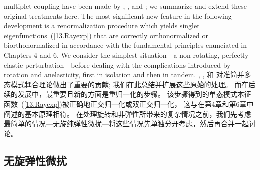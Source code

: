 {{multiplet coupling have been made by \textcite{dahlen69},
\textcite{luh73}, \textcite{woodhouse80} and
\textcite{park&gilbert86}; we summarize and extend
these original treatments here.  The most significant
new feature in the following development
is a renormalization procedure which yields
singlet eigenfunctions~(\ref{13.Rayexp}) that are
correctly orthonormalized or biorthonormalized in accordance with the
fundamental principles enunciated in Chapters 4 and 6.  We consider
the simplest situation---a non-rotating, perfectly
elastic perturbation---before dealing with the
complications introduced by rotation and anelasticity,
first in isolation and then in tandem.
\fi
\textcite{dahlen69},
\textcite{luh73}, \textcite{woodhouse80} 和
\textcite{park&gilbert86}
对准简并多态模式耦合理论做出了重要的贡献;
我们在此总结并扩展这些原始的处理。
而在后续的发展中，最重要且新的方面是重归一化的步骤。
该步骤得到的单态模式本征函数~(\ref{13.Rayexp})被正确地正交归一化或双正交归一化，
这与在第4章和第6章中阐述的基本原理相符。
在处理旋转和非弹性所带来的复杂情况之前，我们先考虑最简单的情况---无旋纯弹性微扰---将这些情况先单独分开考虑，然后再合并一起讨论。

\subsection{无旋弹性微扰}
%
%

}}
